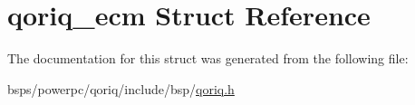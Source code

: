 \hypertarget{structqoriq__ecm}{}\section{qoriq\+\_\+ecm Struct Reference}
\label{structqoriq__ecm}


The documentation for this struct was generated from the following file\+:\begin{DoxyCompactItemize}
\item 
bsps/powerpc/qoriq/include/bsp/\mbox{\hyperlink{qoriq_8h}{qoriq.\+h}}\end{DoxyCompactItemize}
